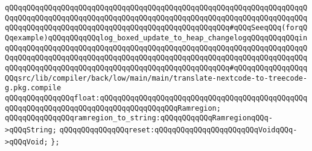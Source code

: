\verb|qQQqqQQqqQQqqQQqqQQqqQQqqQQqqQQqqQQqqQQqqQQqqQQqqQQqqQQqqQQqqQQqqQQqqQQqqQQqqQQqqQQqqQQqqQQqqQQqqQQqqQQqqQQqqQQqqQQqqQQqqQQqqQQqqQQqqQQqqQQqqQQqqQQqqQQqqQQqqQQqqQQqqQQqqQQqqQQqqQQqqQQqqQQqqQQq#qQQqSeeqQQq(forqQQqexample)qQQqqQQqqQQqlog_boxed_update_to_heap_changelogqQQqqQQqqQQqin|\newline
\verb|qQQqqQQqqQQqqQQqqQQqqQQqqQQqqQQqqQQqqQQqqQQqqQQqqQQqqQQqqQQqqQQqqQQqqQQqqQQqqQQqqQQqqQQqqQQqqQQqqQQqqQQqqQQqqQQqqQQqqQQqqQQqqQQqqQQqqQQqqQQqqQQqqQQqqQQqqQQqqQQqqQQqqQQqqQQqqQQqqQQqqQQqqQQqqQQq#qQQqqQQqqQQqqQQqqQQqsrc/lib/compiler/back/low/main/main/translate-nextcode-to-treecode-g.pkg.compile|\newline
\newline
\verb|qQQqqQQqqQQqqQQqfloat:qQQqqQQqqQQqqQQqqQQqqQQqqQQqqQQqqQQqqQQqqQQqqQQqqQQqqQQqqQQqqQQqqQQqqQQqqQQqqQQqqQQqqQQqRamregion;|\newline
\newline
\verb|qQQqqQQqqQQqqQQqramregion_to_string:qQQqqQQqqQQqRamregionqQQq->qQQqString;|\newline
\newline
\verb|qQQqqQQqqQQqqQQqreset:qQQqqQQqqQQqqQQqqQQqqQQqVoidqQQq->qQQqVoid;|\newline
\verb|};|\newline

